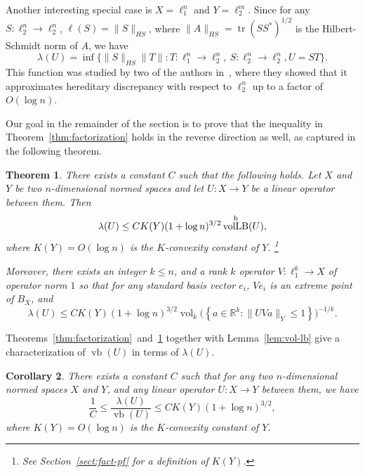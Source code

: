 \documentclass[11pt]{article}
\newtheorem{theorem}{Theorem}
\newtheorem{corollary}[theorem]{Corollary}
\newcommand{\R}{{\mathbb{R}}}
\newcommand{\set}[1]{\left\{ #1 \right\}}
\DeclareMathOperator{\vollb}{volLB}
\DeclareMathOperator{\vb}{vb}
\DeclareMathOperator{\vol}{vol}
\DeclareMathOperator{\tr}{tr}
\begin{document}
Another interesting special case is $X = \ell_1^n$ and $Y =
\ell_2^m$. Since for any $S:\ell_2^n\to \ell_2^n$, $\ell(S) =
\|S\|_{HS}$, where $\|A\|_{HS} = \tr(SS^*)^{1/2}$ is the
Hilbert-Schmidt norm of $A$, we have
\[
\lambda(U) = \inf\{\|S\|_{HS}\|T\|: 
T: \ell_1^n \to \ell_2^n,\ S: \ell_2^n \to \ell_2^n, U = ST\}.
\]
This function was studied by two of the authors in~\cite{NT15}, where
they showed that it approximates hereditary discrepancy with respect
to $\ell_2^n$ up to a factor of $O(\log n)$. 

Our goal in the remainder of the section is to prove that the
inequality in Theorem~\ref{thm:factorization} holds in the reverse
direction as well, as captured in the following theorem.

\begin{theorem}\label{thm:fact-vollb}
  There exists a constant $C$ such that the following holds. Let $X$
  and $Y$ be two $n$-dimensional normed spaces and let $U:X \to Y$ be
  a linear operator between them.
  Then
  \[
  \lambda(U) \le C K(Y) (1 + \log n)^{3/2}\vollb^{\rm h}(U),
  \]
  where $K(Y) = O(\log n)$ is the $K$-convexity constant of $Y$.
  \footnote{See Section~\ref{sect:fact-pf} for a definition of
    $K(Y)$.}  
  
  Moreover, there exists an integer $k\le n$, and a rank $k$ operator
  $V:\ell_1^k\to X$ of operator norm $1$ so that for any standard
  basis vector $e_i$, $Ve_i$ is an extreme point of $B_X$, and
  \[
  \lambda(U) \le C K(Y) (1 + \log n)^{3/2}
  \vol_k\bigl(\set{a \in \R^k: \|UV a\|_Y \le 1}\bigr)^{-1/k}.
  \]
\end{theorem}

Theorems~\ref{thm:factorization}~and~\ref{thm:fact-vollb} together
with Lemma~\ref{lem:vol-lb} give a characterization of $\vb(U)$ in
terms of $\lambda(U)$.

\begin{corollary}\label{cor:vb-apx}
  There exists a constant $C$ such that for any two $n$-dimensional
  normed spaces $X$ and $Y$, and any linear operator $U:X \to Y$
  between them, we have
  \[
  \frac1C \le \frac{\lambda(U)}{\vb(U)} \le C K(Y) (1 + \log n)^{3/2},
  \]
  where $K(Y) = O(\log n)$ is the $K$-convexity constant of $Y$. 
\end{corollary}
\end{document}
